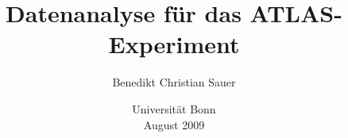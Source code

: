\documentclass[a4paper,oneside]{scrartcl}
\author{Benedikt Christian Sauer}
\title{Datenanalyse für das ATLAS-Experiment}
\begin{document}
    \begin{titlepage}
        \date{\vspace{1cm} Universität Bonn \\ August 2009}
    \end{titlepage}
\maketitle
\newpage
\tableofcontents
\newpage




\end{document}
